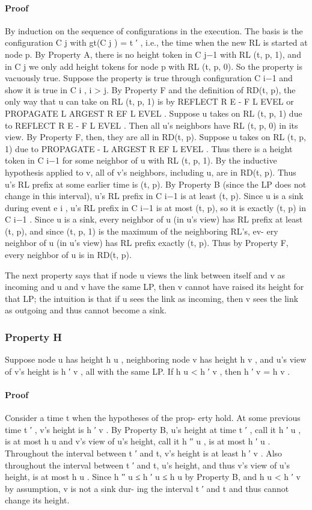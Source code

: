 \documentclass{article}
\begin{document}
\paragraph{Proof}
By induction on the sequence of configurations in
the execution.
The basis is the configuration C j with gt(C j ) = t ′ , i.e.,
the time when the new RL is started at node p. By Property
A, there is no height token in C j−1 with RL (t, p, 1), and in
C j we only add height tokens for node p with RL (t, p, 0).
So the property is vacuously true.
Suppose the property is true through configuration C i−1
and show it is true in C i , i > j.
By Property F and the definition of RD(t, p), the only
way that u can take on RL (t, p, 1) is by REFLECT R E -
F L EVEL or PROPAGATE L ARGEST R EF L EVEL .
Suppose u takes on RL (t, p, 1) due to REFLECT R E -
F L EVEL . Then all u’s neighbors have RL (t, p, 0) in its
view. By Property F, then, they are all in RD(t, p).
Suppose u takes on RL (t, p, 1) due to PROPAGATE -
L ARGEST R EF L EVEL . Thus there is a height token in C i−1
for some neighbor of u with RL (t, p, 1). By the inductive
hypothesis applied to v, all of v’s neighbors, including u,
are in RD(t, p). Thus u’s RL prefix at some earlier time is
(t, p). By Property B (since the LP does not change in this
interval), u’s RL prefix in C i−1 is at least (t, p). Since u
is a sink during event e i , u’s RL prefix in C i−1 is at most
(t, p), so it is exactly (t, p) in C i−1 . Since u is a sink, every
neighbor of u (in u’s view) has RL prefix at least (t, p), and
since (t, p, 1) is the maximum of the neighboring RL’s, ev-
ery neighbor of u (in u’s view) has RL prefix exactly (t, p).
Thus by Property F, every neighbor of u is in RD(t, p).

The next property says that if node u views the link
between itself and v as incoming and u and v have the same
LP, then v cannot have raised its height for that LP; the
intuition is that if u sees the link as incoming, then v sees
the link as outgoing and thus cannot become a sink.

\subsubsection{Property H}
Suppose node u has height h u , neighboring
node v has height h v , and u’s view of v’s height is h ′ v , all
with the same LP. If h u < h ′ v , then h ′ v = h v .\\
\paragraph{Proof}
Consider a time t when the hypotheses of the prop-
erty hold. At some previous time t ′ , v’s height is h ′ v . By
Property B, u’s height at time t ′ , call it h ′ u , is at most h u and
v’s view of u’s height, call it h ′′ u , is at most h ′ u . Throughout
the interval between t ′ and t, v’s height is at least h ′ v . Also
throughout the interval between t ′ and t, u’s height, and thus
v’s view of u’s height, is at most h u . Since h ′′ u ≤ h ′ u ≤ h u by
Property B, and h u < h ′ v by assumption, v is not a sink dur-
ing the interval t ′ and t and thus cannot change its height.
\end{document}

